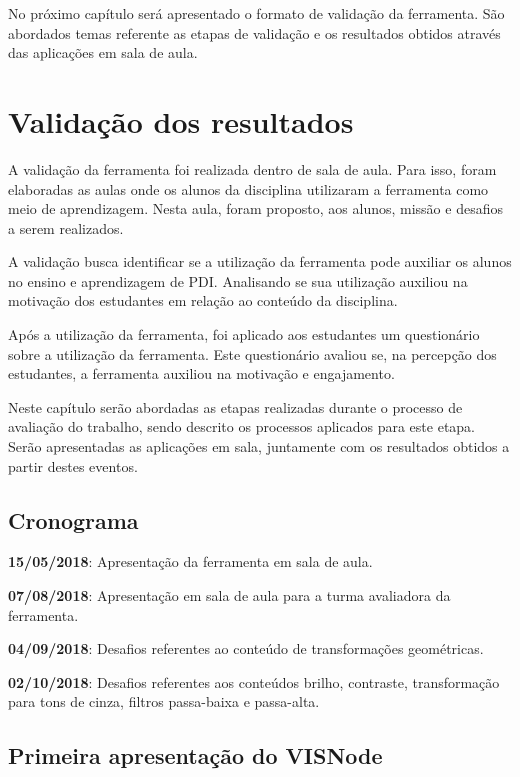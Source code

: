 \documentclass[
	12pt,				%
	oneside,			%
	a4paper,			%
	english,			%
	french,				%
	spanish,			%
	brazil,				%
	]{abntex2}
\begin{document}
No próximo capítulo será apresentado o formato de validação da ferramenta. São abordados temas referente as etapas de validação e os resultados obtidos através das aplicações em sala de aula.

\chapter{Validação dos resultados}

A validação da ferramenta foi realizada dentro de sala de aula. Para isso, foram elaboradas as aulas onde os alunos da disciplina utilizaram a ferramenta como meio de aprendizagem. Nesta aula, foram proposto, aos alunos, missão e desafios a serem realizados.

A validação busca identificar se a utilização da ferramenta pode auxiliar os alunos no ensino e aprendizagem de PDI. Analisando se sua utilização auxiliou na motivação dos estudantes em relação ao conteúdo da disciplina.

Após a utilização da ferramenta, foi aplicado aos estudantes um questionário sobre a utilização da ferramenta. Este questionário avaliou se, na percepção dos estudantes, a ferramenta auxiliou na motivação e engajamento.

Neste capítulo serão abordadas as etapas realizadas durante o processo de avaliação do trabalho, sendo descrito os processos aplicados para este etapa. Serão apresentadas as aplicações em sala, juntamente com os resultados obtidos a partir destes eventos.

\section{Cronograma}

\textbf{15/05/2018}: Apresentação da ferramenta em sala de aula.

\textbf{07/08/2018}: Apresentação em sala de aula para a turma avaliadora da ferramenta.

\textbf{04/09/2018}: Desafios referentes ao conteúdo de transformações geométricas.

\textbf{02/10/2018}: Desafios referentes aos conteúdos brilho, contraste, transformação para tons de cinza, filtros passa-baixa e passa-alta.

\section{Primeira apresentação do VISNode}
\label{validacao:piloto1}
\end{document}
